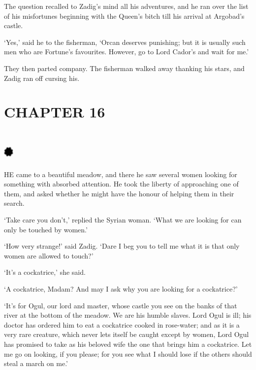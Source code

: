 \documentclass{article}
\begin{document}
\begin{center}
The question recalled to Zadig's mind all his adventures, and he ran over the list 
of his misfortunes beginning with the Queen's bitch till his arrival at Argobad's 
castle. 

`Yes,' said he to the fisherman, `Orcan deserves punishing; but it is usually such 
men who are Fortune's favourites. However, go to Lord Cador's and wait for me.' 

They then parted company. The fisherman walked away thanking his stars, and Zadig 
ran off cursing his.\pagebreak{} 

\section*{\textbf{CHAPTER 16 }}

\section*{%
\includegraphics[width=14pt, height=15pt, keepaspectratio=true]{Zadig or L'Ingenu - Voltaire-fig019.jpg}
}

 

HE came to a beautiful meadow, and there he saw several women looking for something 
with absorbed attention. He took the liberty of approaching one of them, and asked 
whether he might have the honour of helping them in their search. 

`Take care you don't,' replied the Syrian woman. `What we are looking for can only 
be touched by women.' 

`How very strange!' said Zadig. `Dare I beg you to tell me what it is that only 
women are allowed to touch?' 

`It's a cockatrice,' she said. 

`A cockatrice, Madam? And may I ask why you are looking for a cockatrice?' 

`It's for Ogul, our lord and master, whose castle you see on the banks of that 
river at the bottom of the meadow. We are his humble slaves. Lord Ogul is ill; 
his doctor has ordered him to eat a cockatrice cooked in rose-water; and as it 
is a very rare creature, which never lets itself be caught except by women, Lord 
Ogul has promised to take as his beloved wife the one that brings him a cockatrice. 
Let me go on looking, if you please; for you see what I should lose if the others 
should steal a march on me.' 


\end{center}
\end{document}
